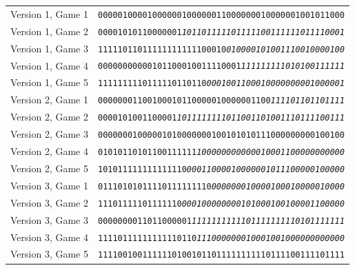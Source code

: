 \documentclass[authoryear]{elsarticle}
\begin{document}
\begin{center}
\begin{tabular}{l|l}
Version 1, Game 1 & \texttt{00000100001000000100000011000000010000001001011000}\\
Version 1, Game 2 & \texttt{00001010110000001\textit{101101111101111100111111011110001}}\\
Version 1, Game 3 & \texttt{11111011011111111111100010\textit{010000101001110010000100}}\\
Version 1, Game 4 & \texttt{00000000000101100010011110001\textit{111111111010100111111}}\\
Version 1, Game 5 & \texttt{1111111110111110110110\textit{0001001100010000000001000001}}\\ \hline
Version 2, Game 1 & \texttt{00000001100100010110000010000001100\textit{111101101101111}}\\
Version 2, Game 2 & \texttt{0000101001100001\textit{1011111111011001101001110111100111}}\\
Version 2, Game 3 & \texttt{00000001000001010000000100101010111000000000100100}\\
Version 2, Game 4 & \texttt{01010110101100111111\textit{100000000000010001100000000000}}\\
Version 2, Game 5 & \texttt{101011111111111110\textit{00011000010000001011100000100000}}\\ \hline
Version 3, Game 1 & \texttt{01110101011110111111110\textit{000000010000100010000010000}}\\
Version 3, Game 2 & \texttt{11101111101111110\textit{000100000000101000100100001100000}}\\
Version 3, Game 3 & \texttt{0000000011011000001\textit{1111111111101111111110101111111}}\\
Version 3, Game 4 & \texttt{11110111111111110110\textit{111000000010001001000000000000}}\\
Version 3, Game 5 & \texttt{11110010011111101001011011111111110111100111101111}\\
\end{tabular}
\end{center}
\end{document}
